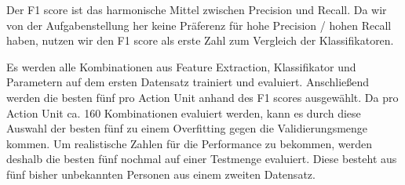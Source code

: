 Der F1 score ist das harmonische Mittel zwischen Precision und Recall. Da wir
von der Aufgabenstellung her keine Präferenz für hohe Precision / hohen Recall
haben, nutzen wir den F1 score als erste Zahl zum Vergleich der Klassifikatoren.

Es werden alle Kombinationen aus Feature Extraction, Klassifikator und Parametern
auf dem ersten Datensatz trainiert und evaluiert. Anschließend werden die besten
fünf pro Action Unit anhand des F1 scores ausgewählt. Da pro Action Unit ca. 160
Kombinationen evaluiert werden, kann es durch diese Auswahl der besten fünf zu
einem Overfitting gegen die Validierungsmenge kommen. Um realistische Zahlen für
die Performance zu bekommen, werden deshalb die besten fünf nochmal auf einer
Testmenge evaluiert. Diese besteht aus fünf bisher unbekannten Personen aus
einem zweiten Datensatz.
  


